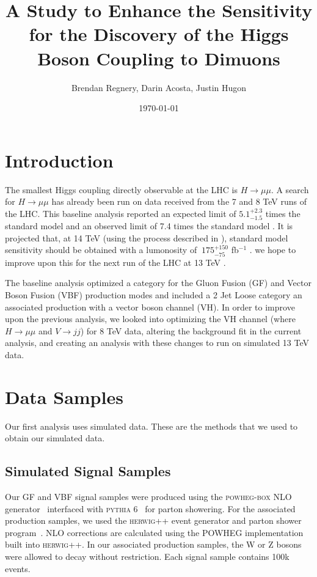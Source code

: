 \documentclass[12pt]{article}
\title{A Study to Enhance the Sensitivity for the Discovery of the Higgs Boson Coupling to Dimuons}
\author{Brendan Regnery, Darin Acosta, Justin Hugon}
\date{\today}
\begin{document}
\maketitle
 
\section{Introduction}

The smallest Higgs coupling directly observable at the LHC is $H\rightarrow \mu \mu$. 
A search for $H\rightarrow \mu \mu$ has already been run on data received from the 7 and 8 TeV runs of the LHC. 
This baseline analysis reported an expected limit of $5.1^{+2.3}_{-1.5}$ times the standard model
and an observed limit of 7.4 times the standard model \cite{hmumuPap}. It is projected that, 
at 14 TeV (using the process described in \cite{snow}), 
standard model sensitivity should be obtained with a lumonosity of $~175^{+150}_{-75}$ fb$^{-1}$ \cite{hmumuPap}. 
we hope to improve upon this for the next run of the LHC at 13 TeV \cite{AN2012_459}. 

The baseline analysis optimized a category for the Gluon Fusion (GF) and Vector Boson Fusion (VBF) production modes and included 
a 2 Jet Loose category an associated production with a vector boson channel (VH). 
In order to improve upon the previous analysis, we looked into optimizing the VH channel (where $H\rightarrow \mu \mu$ and $V\rightarrow jj$) for 8 TeV data, 
altering the background fit in the current analysis, and creating an analysis with these changes to run on simulated 13 TeV data.

\section{Data Samples}

Our first analysis uses simulated data. These are the methods that we used to obtain our simulated data.

\subsection{Simulated Signal Samples}

Our GF and VBF signal samples were produced using the \textsc{powheg-box} NLO generator~\cite{powheg1,powheg2,powheg3} 
interfaced with \textsc{pythia} 6~\cite{pythia} for parton showering.
For the associated production samples, we used the \textsc{herwig}++ event generator and 
parton shower program~\cite{herwigpp}.  NLO corrections are calculated using the 
POWHEG implementation built into \textsc{herwig}++. 
In our associated production samples, the W or Z bosons were allowed to decay without restriction.
Each signal sample contains 100k events.
\end{document}
